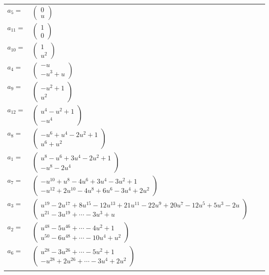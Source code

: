 \documentclass[1p]{elsarticle_modified}
\theoremstyle{definition}
\begin{document}
\begin{tabular}{m{7pt} m{180pt} m{7pt} m{180pt} }
\flushright $a_{5}=$&$\begin{pmatrix}0\\u\end{pmatrix}$ \\
\flushright $a_{11}=$&$\begin{pmatrix}1\\0\end{pmatrix}$ \\
\flushright $a_{10}=$&$\begin{pmatrix}1\\u^2\end{pmatrix}$ \\
\flushright $a_{4}=$&$\begin{pmatrix}- u\\- u^3+u\end{pmatrix}$ \\
\flushright $a_{9}=$&$\begin{pmatrix}- u^2+1\\u^2\end{pmatrix}$ \\
\flushright $a_{12}=$&$\begin{pmatrix}u^4- u^2+1\\- u^4\end{pmatrix}$ \\
\flushright $a_{8}=$&$\begin{pmatrix}- u^6+u^4-2 u^2+1\\u^6+u^2\end{pmatrix}$ \\
\flushright $a_{1}=$&$\begin{pmatrix}u^8- u^6+3 u^4-2 u^2+1\\- u^8-2 u^4\end{pmatrix}$ \\
\flushright $a_{7}=$&$\begin{pmatrix}- u^{10}+u^8-4 u^6+3 u^4-3 u^2+1\\- u^{12}+2 u^{10}-4 u^8+6 u^6-3 u^4+2 u^2\end{pmatrix}$ \\
\flushright $a_{3}=$&$\begin{pmatrix}u^{19}-2 u^{17}+8 u^{15}-12 u^{13}+21 u^{11}-22 u^9+20 u^7-12 u^5+5 u^3-2 u\\u^{21}-3 u^{19}+\cdots-3 u^3+u\end{pmatrix}$ \\
\flushright $a_{2}=$&$\begin{pmatrix}u^{48}-5 u^{46}+\cdots-4 u^2+1\\u^{50}-6 u^{48}+\cdots-10 u^4+u^2\end{pmatrix}$ \\
\flushright $a_{6}=$&$\begin{pmatrix}u^{28}-3 u^{26}+\cdots-5 u^2+1\\- u^{28}+2 u^{26}+\cdots-3 u^4+2 u^2\end{pmatrix}$\\&\end{tabular}
\end{document}

